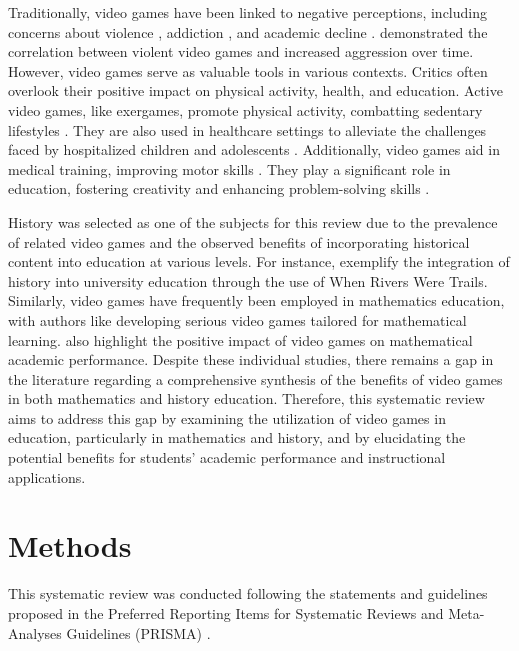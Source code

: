 \documentclass[english]{textolivre}
\begin{document}
Traditionally, video games have been linked to negative perceptions, including concerns about violence \cite{anderson_video_2000,gentile_effects_2004}, addiction \cite{salguero_measuring_2002,chiu_relative_2012}, and academic decline \cite{anand_study_2007,ip_gaming_2008}. \textcite{anderson_video_2000} demonstrated the correlation between violent video games and increased aggression over time. However, video games serve as valuable tools in various contexts. Critics often overlook their positive impact on physical activity, health, and education. Active video games, like exergames, promote physical activity, combatting sedentary lifestyles \cite{beltran-carrillo_videojuegos_2011,zhao_effects_2024}. They are also used in healthcare settings to alleviate the challenges faced by hospitalized children and adolescents \cite{ledo_rubio_videojuegos_2016,busto_martinez_uso_2012}. Additionally, video games aid in medical training, improving motor skills \cite{akand_does_2016}. They play a significant role in education, fostering creativity and enhancing problem-solving skills \cite{etxeberria_balerdi_videojuegos_2001,roncancio-ortiz_uso_2017,triberti_brain_2023}.

History was selected as one of the subjects for this review due to the prevalence of related video games and the observed benefits of incorporating historical content into education at various levels. For instance, \textcite{emmons_i_2021} exemplify the integration of history into university education through the use of When Rivers Were Trails. Similarly, video games have frequently been employed in mathematics education, with authors like \textcite{chorianopoulos_design_2014} developing serious video games tailored for mathematical learning. \textcite{drummond_video-games_2014} also highlight the positive impact of video games on mathematical academic performance. Despite these individual studies, there remains a gap in the literature regarding a comprehensive synthesis of the benefits of video games in both mathematics and history education. Therefore, this systematic review aims to address this gap by examining the utilization of video games in education, particularly in mathematics and history, and by elucidating the potential benefits for students’ academic performance and instructional applications.

\section{Methods}\label{sec-normas}
This systematic review was conducted following the statements and guidelines proposed in the Preferred Reporting Items for Systematic Reviews and Meta-Analyses Guidelines (PRISMA) \cite{moher_items_2014}.
\end{document}
